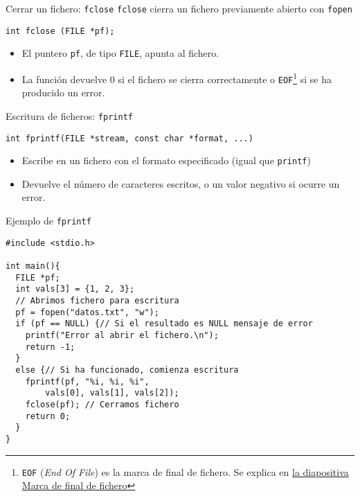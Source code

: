 \documentclass[usenames,svgnames,dvipsnames, aspectratio=169]{beamer}
\begin{document}
\begin{frame}[label={sec:org89ad9c4},fragile]{Cerrar un fichero: \texttt{fclose}}
 \texttt{fclose} cierra un fichero previamente abierto con \texttt{fopen}

\lstset{language=C,label= ,caption= ,captionpos=b,numbers=none}
\begin{lstlisting}
int fclose (FILE *pf);
\end{lstlisting}

\begin{itemize}
\item El puntero \texttt{pf}, de tipo \texttt{FILE}, apunta al fichero.
\item La función devuelve 0 si el fichero se cierra correctamente o \texttt{EOF}\footnote{\texttt{EOF} (\emph{End Of File}) es la marca de final de fichero. Se explica en \hyperlink{sec:org78d0553}{la diapositiva \guillemotleft{}Marca de final de fichero\guillemotright{}}} si se ha producido un error.
\end{itemize}
\end{frame}

\begin{frame}[label={sec:orgce42080},fragile]{Escritura de ficheros: \texttt{fprintf}}
 \lstset{language=C,label= ,caption= ,captionpos=b,numbers=none}
\begin{lstlisting}
int fprintf(FILE *stream, const char *format, ...)
\end{lstlisting}

\begin{itemize}
\item Escribe en un fichero con el formato especificado (\alert{igual que \texttt{printf}})

\item Devuelve el número de caracteres escritos, o un valor negativo si ocurre un error.
\end{itemize}
\end{frame}


\begin{frame}[label={sec:orgeee56c1},fragile,plain]{Ejemplo de \texttt{fprintf}}
 \lstset{language=C,label= ,caption= ,captionpos=b,numbers=none}
\begin{lstlisting}
#include <stdio.h>

int main(){
  FILE *pf;
  int vals[3] = {1, 2, 3};
  // Abrimos fichero para escritura
  pf = fopen("datos.txt", "w");
  if (pf == NULL) {// Si el resultado es NULL mensaje de error 
    printf("Error al abrir el fichero.\n");
    return -1;
  }
  else {// Si ha funcionado, comienza escritura
    fprintf(pf, "%i, %i, %i",
	    vals[0], vals[1], vals[2]);
    fclose(pf); // Cerramos fichero
    return 0;
  }
}
\end{lstlisting}
\end{frame}
\end{document}
